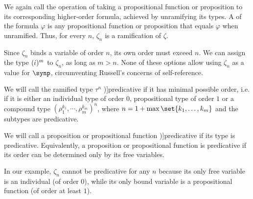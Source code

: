 \begin{definition}
\begin{thmenum}
    We again call  the operation of taking a propositional function or proposition to its corresponding higher-order formula, achieved by unramifying its types. A  of the formula \( \varphi \) is any propositional function or proposition that equals \( \varphi \) when unramified. Thus, for every \( n \), \( \zeta_n \) is a ramification of \( \zeta \).

    Since \( \zeta_n \) binds a variable of order \( n \), its own order must exceed \( n \). We can assign the type \( (\dot{\iota})^m \) to \( \zeta_n \), as long as \( m > n \). None of these options allow using \( \zeta_n \) as a value for \( \synp \), circumventing Russell's concerns of self-reference.

     We will call the ramified type \( \tau^n \) \term[en=predicative type (\cite[def. 2.40]{KamareddineLaanNederpelt2005TypeTheory})]{predicative} if it has minimal possible order, i.e. if it is either an individual type of order \( 0 \), propositional type of order \( 1 \) or a compound type \( (\rho_1^{k_1}, \cdots, \rho_m^{k_m})^n \), where \( n = 1 + \max\set{ k_1, \ldots, k_m } \) and the subtypes are predicative.

    We will call a proposition or propositional function \term[en=predicative (function) (\cite[239]{Russell1908TypeTheory})]{predicative} if its type is predicative. Equivalently, a proposition or propositional function is predicative if its order can be determined only by its free variables.

    In our example, \( \zeta_n \) cannot be predicative for any \( n \) because its only free variable is an individual (of order \( 0 \)), while its only bound variable is a propositional function (of order at least \( 1 \)).


\end{thmenum}
\end{definition}
